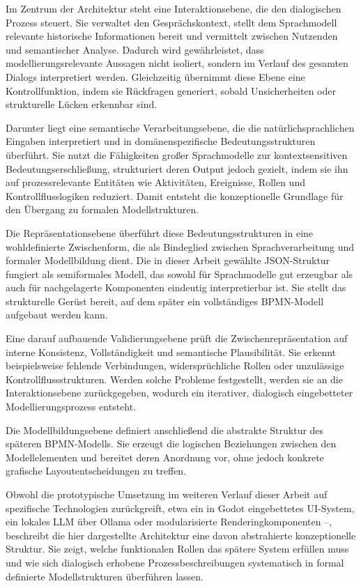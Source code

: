 \documentclass[a4paper,12pt]{scrreprt}
\begin{document}
Im Zentrum der Architektur steht eine Interaktionsebene, die den dialogischen Prozess steuert. Sie verwaltet den Gesprächskontext, stellt dem Sprachmodell relevante historische Informationen bereit und vermittelt zwischen Nutzenden und semantischer Analyse. Dadurch wird gewährleistet, dass modellierungsrelevante Aussagen nicht isoliert, sondern im Verlauf des gesamten Dialogs interpretiert werden. Gleichzeitig übernimmt diese Ebene eine Kontrollfunktion, indem sie Rückfragen generiert, sobald Unsicherheiten oder strukturelle Lücken erkennbar sind.

Darunter liegt eine semantische Verarbeitungsebene, die die natürlichsprachlichen Eingaben interpretiert und in domänenspezifische Bedeutungsstrukturen überführt. Sie nutzt die Fähigkeiten großer Sprachmodelle zur kontextsensitiven Bedeutungserschließung, strukturiert deren Output jedoch gezielt, indem sie ihn auf prozessrelevante Entitäten wie Aktivitäten, Ereignisse, Rollen und Kontrollflusslogiken reduziert. Damit entsteht die konzeptionelle Grundlage für den Übergang zu formalen Modellstrukturen.

Die Repräsentationsebene überführt diese Bedeutungsstrukturen in eine wohldefinierte Zwischenform, die als Bindeglied zwischen Sprachverarbeitung und formaler Modellbildung dient. Die in dieser Arbeit gewählte JSON-Struktur fungiert als semiformales Modell, das sowohl für Sprachmodelle gut erzeugbar als auch für nachgelagerte Komponenten eindeutig interpretierbar ist. Sie stellt das strukturelle Gerüst bereit, auf dem später ein vollständiges BPMN-Modell aufgebaut werden kann.

Eine darauf aufbauende Validierungsebene prüft die Zwischenrepräsentation auf interne Konsistenz, Vollständigkeit und semantische Plausibilität. Sie erkennt beispielsweise fehlende Verbindungen, widersprüchliche Rollen oder unzulässige Kontrollflussstrukturen. Werden solche Probleme festgestellt, werden sie an die Interaktionsebene zurückgegeben, wodurch ein iterativer, dialogisch eingebetteter Modellierungsprozess entsteht.

Die Modellbildungsebene definiert anschließend die abstrakte Struktur des späteren BPMN-Modells. Sie erzeugt die logischen Beziehungen zwischen den Modell­elementen und bereitet deren Anordnung vor, ohne jedoch konkrete grafische Layoutentscheidungen zu treffen.

Obwohl die prototypische Umsetzung im weiteren Verlauf dieser Arbeit auf spezifische Technologien zurückgreift, etwa ein in Godot eingebettetes UI-System, ein lokales LLM über Ollama oder modularisierte Renderingkomponenten –, beschreibt die hier dargestellte Architektur eine davon abstrahierte konzeptionelle Struktur. Sie zeigt, welche funktionalen Rollen das spätere System erfüllen muss und wie sich dialogisch erhobene Prozessbeschreibungen systematisch in formal definierte Modellstrukturen überführen lassen.
\end{document}
